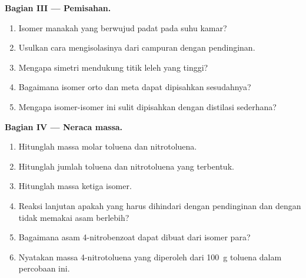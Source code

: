 \begin{problem}
\medskip
\noindent\textbf{Bagian III --- Pemisahan.}
\begin{enumerate}[resume]
  \item Isomer manakah yang berwujud padat pada suhu kamar?
  \item Usulkan cara mengisolasinya dari campuran dengan pendinginan.
  \item Mengapa simetri mendukung titik leleh yang tinggi?
  \item Bagaimana isomer orto dan meta dapat dipisahkan sesudahnya?
  \item Mengapa isomer-isomer ini sulit dipisahkan dengan distilasi sederhana?
\end{enumerate}

\medskip
\noindent\textbf{Bagian IV --- Neraca massa.}
\begin{enumerate}[resume]
  \item Hitunglah massa molar toluena dan nitrotoluena.
  \item Hitunglah jumlah toluena dan nitrotoluena yang terbentuk.
  \item Hitunglah massa ketiga isomer.
  \item Reaksi lanjutan apakah yang harus dihindari dengan pendinginan dan
        dengan tidak memakai asam berlebih?
  \item Bagaimana asam 4-nitrobenzoat dapat dibuat dari isomer para?
  \item Nyatakan massa 4-nitrotoluena yang diperoleh dari \qty{100}{g} toluena
        dalam percobaan ini.
\end{enumerate}
\end{problem}
